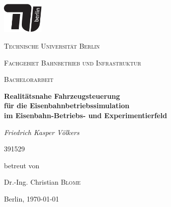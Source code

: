\newpage
\centering
\includegraphics[width=0.15\textwidth]{../images/tu_Logo/TU_Logo_kurz_1c_schwarz.pdf}\par\vspace{1cm}
{\scshape\LARGE Technische Universität Berlin\par}
\vspace{0cm}
{\scshape\normalsize Fachgebiet Bahnbetrieb und Infrastruktur\par}
\vspace{1cm}
{\scshape\LARGE Bachelorarbeit\par}
\vspace{1.5cm}
{\LARGE\bfseries Realitätsnahe Fahrzeugsteuerung\\für die Eisenbahnbetriebssimulation\\im Eisenbahn-Betriebs- und Experimentierfeld\par}
\vspace{2cm}
{\Large\itshape Friedrich Kasper Völkers\par}
\vspace{0cm}
{\normalsize 391529\par}
\vfill
betreut von\par
Dr.-Ing. Christian \textsc{Blome}

\vfill
{\large Berlin, \today\par}
\justifying
\newpage